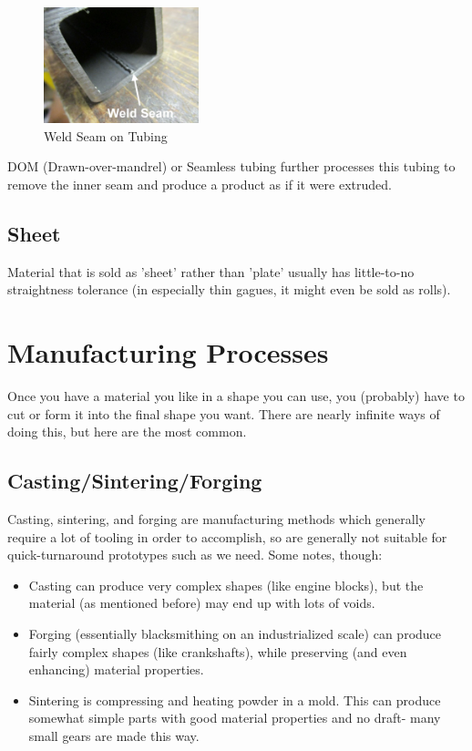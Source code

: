 \documentclass[10pt,letterpaper]{book}
\begin{document}
   \begin{figure}[H]
	\centering
	\includegraphics[width=0.4\textwidth]{imgs/welded_tube_seam.png}
	
	\caption{Weld Seam on Tubing}
\end{figure}
 
 DOM (Drawn-over-mandrel) or Seamless tubing further processes this tubing to remove the inner seam and produce a product as if it were extruded.
 
 \subsection{Sheet}
 Material that is sold as 'sheet' rather than 'plate' usually has little-to-no straightness tolerance (in especially thin gagues, it might even be sold as rolls).
 
 \section{Manufacturing Processes}
 
 Once you have a material you like in a shape you can use, you (probably) have to cut or form it into the final shape you want. There are nearly infinite ways of doing this, but here are the most common.
 
 \subsection{Casting/Sintering/Forging}
 
 Casting, sintering, and forging are manufacturing methods which generally require a lot of tooling in order to accomplish, so are generally not suitable for quick-turnaround prototypes such as we need. Some notes, though:
 
 \begin{itemize}
 	\item Casting can produce very complex shapes (like engine blocks), but the material (as mentioned before) may end up with lots of voids.
 	\item Forging (essentially blacksmithing on an industrialized scale) can produce fairly complex shapes (like crankshafts), while preserving (and even enhancing) material properties.
 	\item Sintering is compressing and heating powder in a mold. This can produce somewhat simple parts with good material properties and no draft- many small gears are made this way.
 \end{itemize}
 
\end{document}
